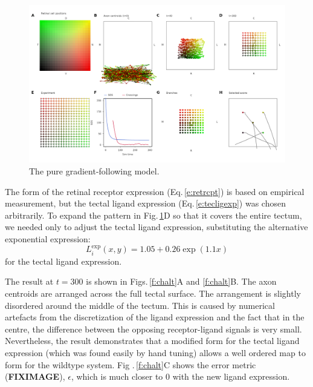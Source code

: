 \documentclass[11pt, a4paper]{article}
\begin{document}
\begin{figure}
\includegraphics[width=\linewidth]{./images/j4_ee_G_wt_fig2.png}
\caption{The pure gradient-following model.}
\label{f:ch}
\end{figure}

The form of the retinal receptor expression (Eq.\,\ref{e:retrcpt}) is based on
empirical measurement, but the tectal ligand expression
(Eq.\,\ref{e:tecligexp}) was chosen arbitrarily. To expand the pattern in
Fig.\,\ref{f:ch}D so that it covers the entire tectum, we needed only to
adjust the tectal ligand expression, substituting the alternative exponential
expression:
%
\begin{equation} \label{e:tecligexp2}
L_i^{\text{exp}}(x,y) = 1.05 + 0.26 \exp(1.1 x)
\end{equation}
%
for the tectal ligand expression.

The result at $t=300$ is shown in Figs.\,\ref{f:chalt}A and \ref{f:chalt}B. The
axon centroids are arranged across the full tectal surface.  The arrangement
is slightly disordered around the middle of the tectum. This is caused by
numerical artefacts from the discretization of the ligand expression and the
fact that in the centre, the difference between the opposing receptor-ligand
signals is very small. Nevertheless, the result demonstrates that a modified
form for the tectal ligand expression (which was found easily by hand tuning)
allows a well ordered map to form for the wildtype system. Fig
.\,\ref{f:chalt}C shows the error metric (\textbf{FIXIMAGE}), $\epsilon$,
which is much closer to 0 with the new ligand expression.
\end{document}
